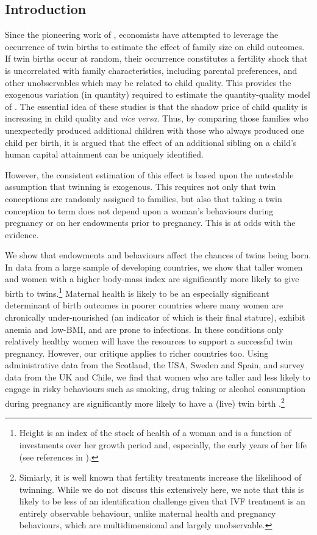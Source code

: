 \documentclass[subeqn]{article}
\begin{document}
\begin{spacing}{1.4}
\section*{Introduction}                             \label{TWINscn:intro}
Since the pioneering work of \citet{RosenzweigWolpin1980}, economists have 
attempted to leverage the occurrence of twin births to estimate the effect of 
family size on child outcomes. If twin births occur at random, their occurrence 
constitutes a fertility shock that is uncorrelated with family characteristics, 
including parental preferences, and other unobservables which may be related to 
child quality. This provides the exogenous variation (in quantity) required to 
estimate the quantity-quality model of \citet{Becker1960,BeckerLewis1973,
BeckerTomes1976}.  The essential idea of these studies is that the shadow price 
of child quality is increasing in child quality and \emph{vice versa}. Thus, by 
comparing those families who unexpectedly produced additional children with 
those who always produced one child per birth, it is argued that the effect of 
an additional sibling on a child's human capital attainment can be uniquely
identified.

However, the consistent estimation of this effect is based upon the untestable 
assumption that twinning is exogenous. This requires not only that twin 
conceptions are randomly assigned to families, but also that taking a twin
conception to term does not depend upon a woman's behaviours during pregnancy 
or on her endowments prior to pregnancy. This is at odds with the evidence.

We show that endowments and behaviours affect the chances of twins being born. 
In data from a large sample of developing countries, we show that taller women 
and women with a higher body-mass index are significantly more likely to give 
birth to twins.\footnote{Height is an index of the stock of health of a woman 
and is a function of investments over her growth period and, especially, the 
early years of her life (see references in \citet{BhalotraRawlings2013}).} 
Maternal health is likely to be an especially significant determinant of birth 
outcomes in poorer countries where many women are chronically under-nourished 
(an indicator of which is their final stature), exhibit anemia and low-BMI, and 
are prone to infections. In these conditions only relatively healthy women will 
have the resources to support a successful twin pregnancy. However, our critique 
applies to richer countries too. Using administrative data from the Scotland,
the USA, Sweden and Spain, and survey data from the UK and Chile, we find that 
women who are taller and less likely to engage in risky behaviours such as 
smoking, drug taking or alcohol consumption during pregnancy are significantly 
more likely to have a (live) twin birth \citep{BhalotraClarke2016}.\footnote{%
  Simiarly, it is well known 
that fertility treatments increase the likelihood of twinning. While we do not 
discuss this extensively here, we note that this is likely to be less of an 
identification challenge given that IVF treatment is an entirely observable 
behaviour, unlike maternal health and pregnancy behaviours, which are 
multidimensional and largely unobservable.}


\end{spacing}
\end{document}
